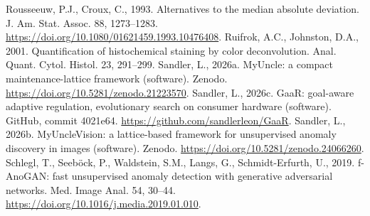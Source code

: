 \documentclass[final,5p,times,twocolumn,authoryear]{elsarticle}
\begin{document}
\begin{thebibliography}{}
 Rousseeuw, P.J., Croux, C., 1993. Alternatives to the median absolute deviation. J. Am. Stat. Assoc. 88, 1273--1283. \url{https://doi.org/10.1080/01621459.1993.10476408}.
 Ruifrok, A.C., Johnston, D.A., 2001. Quantification of histochemical staining by color deconvolution. Anal. Quant. Cytol. Histol. 23, 291--299.
 Sandler, L., 2026a. MyUncle: a compact maintenance-lattice framework (software). Zenodo. \url{https://doi.org/10.5281/zenodo.21223570}.
 Sandler, L., 2026c. GaaR: goal-aware adaptive regulation, evolutionary search on consumer hardware (software). GitHub, commit 4021e64. \url{https://github.com/sandlerleon/GaaR}.
 Sandler, L., 2026b. MyUncleVision: a lattice-based framework for unsupervised anomaly discovery in images (software). Zenodo. \url{https://doi.org/10.5281/zenodo.24066260}.
 Schlegl, T., Seeb{\"o}ck, P., Waldstein, S.M., Langs, G., Schmidt-Erfurth, U., 2019. f-AnoGAN: fast unsupervised anomaly detection with generative adversarial networks. Med. Image Anal. 54, 30--44. \url{https://doi.org/10.1016/j.media.2019.01.010}.
\end{thebibliography}
\end{document}
